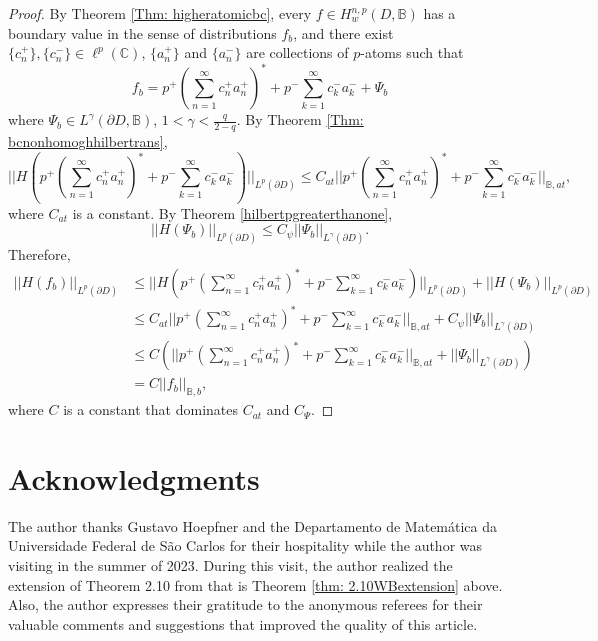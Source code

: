 \documentclass[suppldata]{interact}
\theoremstyle{plain}%
\theoremstyle{definition}
\theoremstyle{remark}
\newcommand{\C}{\mathbb C}
\newcommand{\p}{\partial}
\newcommand{\bc}{\mathbb{B}}
\begin{document}
\begin{proof}
By Theorem \ref{Thm: higheratomicbc}, every $f \in H^{n,p}_{w}(D,\bc)$ has a boundary value in the sense of distributions $f_b$, and there exist $\{c_n^+\}, \{c_n^-\} \in \ell^p(\C)$, $\{a_n^+\}$ and $\{a_n^-\}$ are collections of $p$-atoms such that
\[
    f_b = p^+ \left( \sum_{n=1}^\infty c^+_n a^+_n\right)^* + p^- \sum_{k=1}^\infty c^-_k a^-_k + \Psi_b
\] 
where $\Psi_b \in L^\gamma(\p D, \bc)$, $1 < \gamma< \frac{q}{2-q}$. By Theorem \ref{Thm: bcnonhomoghhilbertrans}, 
\[
    ||H(p^+ \left( \sum_{n=1}^\infty c^+_n a^+_n\right)^* + p^- \sum_{k=1}^\infty c^-_k a^-_k)||_{L^p(\p D)} \leq C_{at}||p^+ \left( \sum_{n=1}^\infty c^+_n a^+_n\right)^* + p^- \sum_{k=1}^\infty c^-_k a^-_k||_{\bc, at},
\]
where $C_{at}$ is a constant. By Theorem \ref{hilbertpgreaterthanone},
\[
    ||H(\Psi_b)||_{L^p(\p D)} \leq C_\psi ||\Psi_b||_{L^\gamma(\p D)}.
\]
Therefore, 
\begin{align*}
    ||H(f_b)||_{L^p(\p D)} 
    &\leq ||H(p^+ \left( \sum_{n=1}^\infty c^+_n a^+_n\right)^* + p^- \sum_{k=1}^\infty c^-_k a^-_k)||_{L^p(\p D)} + ||H(\Psi_b)||_{L^p(\p D)} \\
    &\leq C_{at}||p^+ \left( \sum_{n=1}^\infty c^+_n a^+_n\right)^* + p^- \sum_{k=1}^\infty c^-_k a^-_k||_{\bc, at} + C_\psi ||\Psi_b||_{L^\gamma(\p D)} \\
    &\leq C\left(||p^+ \left( \sum_{n=1}^\infty c^+_n a^+_n\right)^* + p^- \sum_{k=1}^\infty c^-_k a^-_k||_{\bc, at} +  ||\Psi_b||_{L^\gamma(\p D)} \right) \\
    &= C||f_b||_{\bc,b},
\end{align*}
where $C$ is a constant that dominates $C_{at}$ and $C_{\Psi}$. 

\end{proof}





\section*{Acknowledgments}


The author thanks Gustavo Hoepfner and the Departamento de Matemática da Universidade Federal de São Carlos for their hospitality while the author was visiting in the summer of 2023. During this visit, the author realized the extension of Theorem 2.10 from \cite{WB} that is Theorem \ref{thm: 2.10WBextension} above. Also, the author expresses their gratitude to the anonymous referees for their valuable comments and suggestions that improved the quality of this article.
\end{document}
